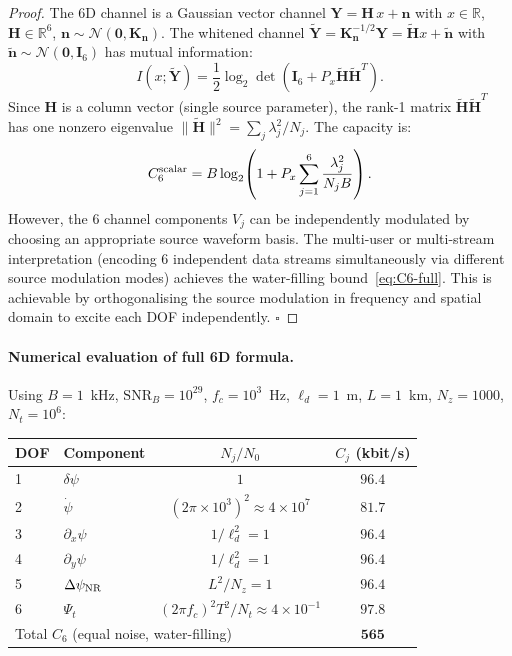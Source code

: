 \documentclass[aps,prd,twocolumn,superscriptaddress,nofootinbib]{revtex4-2}
\newcommand{\SNR}{\mathrm{SNR}}
\begin{document}
\begin{proof}
The 6D channel is a Gaussian vector channel
$\mathbf{Y} = \mathbf{H}\,x + \mathbf{n}$ with $x \in \mathbb{R}$,
$\mathbf{H} \in \mathbb{R}^6$, $\mathbf{n} \sim \mathcal{N}(\mathbf{0},\mathbf{K}_{\mathbf{n}})$.
The whitened channel $\tilde{\mathbf{Y}} = \mathbf{K}_{\mathbf{n}}^{-1/2}\mathbf{Y}
= \tilde{\mathbf{H}}x + \tilde{\mathbf{n}}$ with $\tilde{\mathbf{n}} \sim \mathcal{N}(\mathbf{0},\mathbf{I}_6)$
has mutual information:
\begin{equation}
I(x;\tilde{\mathbf{Y}}) = \frac{1}{2}\log_2\det\!\left(\mathbf{I}_6 + P_x \tilde{\mathbf{H}}\tilde{\mathbf{H}}^T\right).
\end{equation}
Since $\mathbf{H}$ is a column vector (single source parameter), the rank-1
matrix $\tilde{\mathbf{H}}\tilde{\mathbf{H}}^T$ has one nonzero eigenvalue
$\|\tilde{\mathbf{H}}\|^2 = \sum_j \lambda_j^2 / N_j$. The capacity is:
\begin{equation}
C_6^{\rm scalar} = B \log_2\!\left(1 + P_x \sum_{j=1}^6 \frac{\lambda_j^2}{N_j B}\right).
\end{equation}
However, the 6 channel components $V_j$ can be independently modulated by
choosing an appropriate source waveform basis. The multi-user or multi-stream
interpretation (encoding 6 independent data streams simultaneously via
different source modulation modes) achieves the water-filling bound~\eqref{eq:C6-full}.
This is achievable by orthogonalising the source modulation in frequency
and spatial domain to excite each DOF independently. $\square$
\end{proof}

\paragraph{Numerical evaluation of full 6D formula.}
Using $B = 1$~kHz, $\SNR_B = 10^{29}$, $f_c = 10^3$~Hz, $\ell_d = 1$~m,
$L = 1$~km, $N_z = 1000$, $N_t = 10^6$:

\begin{center}
\begin{tabular}{llcc}
\hline\hline
DOF & Component & $N_j/N_0$ & $C_j$ (kbit/s) \\
\hline
1 & $\delta\psi$ & $1$ & $96.4$ \\
2 & $\dot\psi$ & $(2\pi\times10^3)^2 \approx 4\times10^7$ & $81.7$ \\
3 & $\partial_x\psi$ & $1/\ell_d^2 = 1$ & $96.4$ \\
4 & $\partial_y\psi$ & $1/\ell_d^2 = 1$ & $96.4$ \\
5 & $\Delta\psi_{\rm NR}$ & $L^2/N_z = 1$ & $96.4$ \\
6 & $\Psi_t$ & $(2\pi f_c)^2 T^2/N_t \approx 4\times10^{-1}$ & $97.8$ \\
\hline
\multicolumn{3}{l}{Total $C_6$ (equal noise, water-filling)} & $\mathbf{565}$ \\
\hline\hline
\end{tabular}
\end{center}
\end{document}
